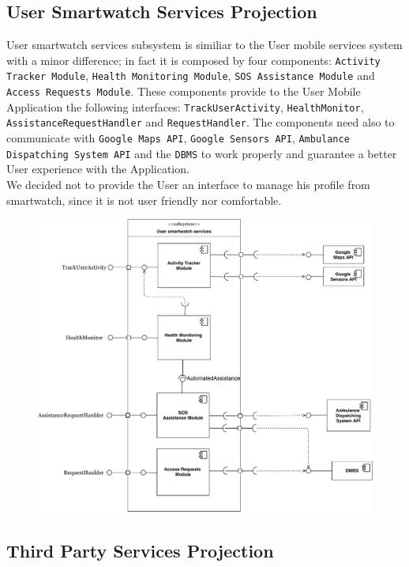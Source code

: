 \documentclass[12pt,a4paper]{article}
\begin{document}
	\newpage
	\subsection{User Smartwatch Services Projection}
		User smartwatch services subsystem is similiar to the User mobile services system with a minor difference; in fact it is composed by four components: \texttt{Activity Tracker Module}, \texttt{Health Monitoring Module}, \texttt{SOS Assistance Module} and \texttt{Access Requests Module}. These components provide to the User Mobile Application the following interfaces: \texttt{TrackUserActivity}, \texttt{HealthMonitor}, \texttt{AssistanceRequestHandler} and \texttt{RequestHandler}. The components need also to communicate with \texttt{Google Maps API}, \texttt{Google Sensors API}, \texttt{Ambulance Dispatching System API} and the \texttt{DBMS} to work properly and guarantee a better User experience with the Application.\\
		We decided not to provide the User an interface to manage his profile from smartwatch, since it is not user friendly nor comfortable.
		\begin{figure}[H]
			\centering
			\includegraphics[height=0.95\linewidth]{images/user_smartwatch_projection}
			\label{fig:user_smartwatch_projection}
		\end{figure}
	
	\subsection{Third Party Services Projection}
	
\end{document}
